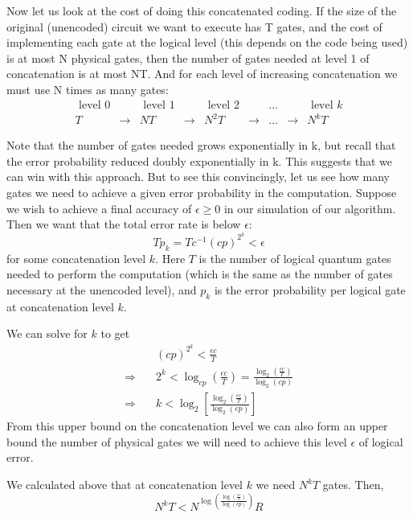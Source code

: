 Now let us look at the cost of doing this concatenated coding. If the size of the original (unencoded) circuit we want to execute has T gates, and the cost of implementing each gate at the logical level (this depends on the code being used) is at most N physical gates, then the number of gates needed at level 1 of concatenation is at most NT. And for each level of increasing concatenation we must use N times as many gates:
$$
\begin{array}{cccccccccc}
\text { level } 0 & & \text { level } 1 & & \text { level } 2 & & \ldots  & & \text { level } k\\
T &\rightarrow & NT &\rightarrow & N^2T & \rightarrow & \ldots &\rightarrow& N^kT
\end{array}
$$


Note that the number of gates needed grows exponentially in k, but recall that the error probability reduced doubly exponentially in k. This suggests that we can win with this approach. But to see this convincingly, let us see how many gates we need to achieve a given error probability in the computation. Suppose we wish to achieve a final accuracy of $\epsilon \geq 0$ in our simulation of our algorithm.
Then we want that the total error rate is below $\epsilon$: 
$$
T p_{k}=T c^{-1}(c p)^{2^{k}}<\epsilon
$$
for some concatenation level $k$. Here $T$ is the number of logical quantum gates needed to perform the computation (which is the same as the number of gates necessary at the unencoded level), and $p_{k}$ is the error probability per logical gate at concatenation level $k$.


We can solve for $k$ to get
$$
\begin{aligned}
&(c p)^{2^{k}}<\frac{\epsilon c}{T} \\
\Rightarrow \quad & 2^{k}<\log _{c p}\left(\frac{\epsilon c}{T}\right)=\frac{\log_2 \left(\frac{\epsilon c}{T}\right)}{\log_2 (c p)} \\
\Rightarrow \quad & k<\log_2 \left[\frac{\log_2 \left(\frac{\epsilon c}{T}\right)}{\log_2 (c p)}\right]
\end{aligned}
$$
From this upper bound on the concatenation level we can also form an upper bound the number of physical gates we will need to achieve this level $\epsilon$ of logical error. 

We calculated above that at concatenation level $k$ we need $N^{k} T$ gates. Then,
$$
N^{k} T<N^{\log \left(\frac{\log \left(\frac{\epsilon c}{T}\right)}{\log (c p)}\right)} R
$$


